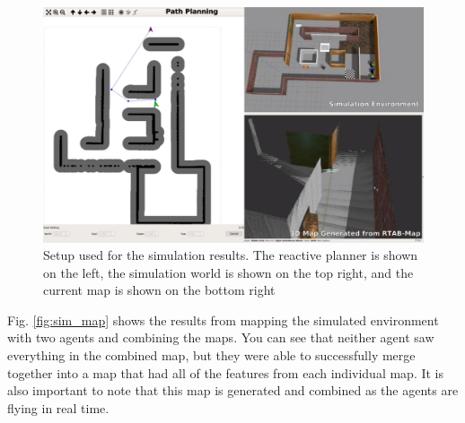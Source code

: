 \documentclass[letterpaper, 10 pt, conference]{ieeeconf}  %
\begin{document}
\begin{figure}
\centering
\includegraphics[width=1.0\linewidth]{sim_setup}
\caption{Setup used for the simulation results. The reactive planner is shown on the left, the simulation world is shown on the top right, and the current map is shown on the bottom right}
\label{fig:sim_setup}
\end{figure}

Fig. \ref{fig:sim_map} shows the results from mapping the simulated environment with two agents and combining the maps. You can see that neither agent saw everything in the combined map, but they were able to successfully merge together into a map that had all of the features from each individual map. It is also important to note that this map is generated and combined as the agents are flying in real time.
\end{document}
